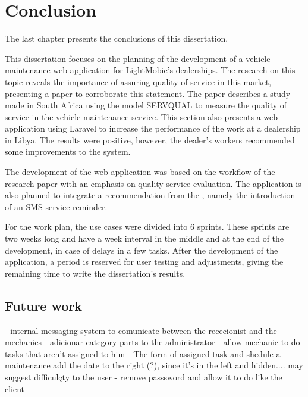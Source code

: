 \chapter{Conclusion}%
\label{chapter:conclusion}

\begin{introduction}
The last chapter presents the conclusions of this dissertation.
\end{introduction} 


This dissertation focuses on the planning of the development of a vehicle maintenance web application for LightMobie's dealerships. 
The research on this topic reveals the importance of assuring quality of service in this market, presenting a paper to corroborate this statement.
The paper describes a study made in South Africa using the model SERVQUAL to measure the quality of service in the vehicle maintenance service.
This section also presents a web application using Laravel to increase the performance of the work at a dealership in Libya. 
The results were positive, however, the dealer's workers recommended some improvements to the system.

The development of the web application was based on the workflow of the research paper with an emphasis on quality service evaluation.
The application is also planned to integrate a recommendation from the \citet{MAS_MOTORS}, namely the introduction of an SMS service reminder. 

For the work plan, the use cases were divided into 6 sprints. 
These sprints are two weeks long and have a week interval in the middle and at the end of the development, in case of delays in a few tasks.
After the development of the application, a period is reserved for user testing and adjustments, giving the remaining time to write the dissertation's results.


\section{Future work}

- internal messaging system to comunicate between the rececionist and the mechanics
- adicionar category parts to the administrator
- allow mechanic to do tasks that aren't assigned to him
- The form of assigned task and shedule a maintenance add the date to the right (?), since it's in the left and hidden.... may suggest difficulçty to the user
- remove passsword and allow it to do like the client

